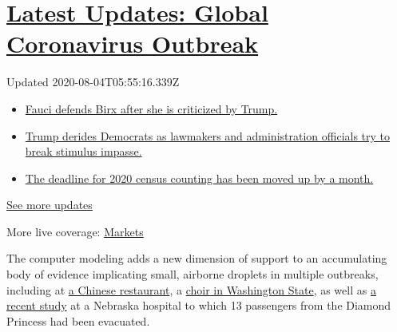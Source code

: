 \hypertarget{latest-updates-global-coronavirus-outbreak}{%
\section{\texorpdfstring{\href{https://www.nytimes.com/2020/08/03/world/coronavirus-covid-19.html?action=click\&pgtype=Article\&state=default\&region=MAIN_CONTENT_1\&context=storylines_live_updates}{Latest
Updates: Global Coronavirus
Outbreak}}{Latest Updates: Global Coronavirus Outbreak}}\label{latest-updates-global-coronavirus-outbreak}}

Updated 2020-08-04T05:55:16.339Z

\begin{itemize}
\tightlist
\item
  \href{https://www.nytimes.com/2020/08/03/world/coronavirus-covid-19.html?action=click\&pgtype=Article\&state=default\&region=MAIN_CONTENT_1\&context=storylines_live_updates\#link-4547638f}{Fauci
  defends Birx after she is criticized by Trump.}
\item
  \href{https://www.nytimes.com/2020/08/03/world/coronavirus-covid-19.html?action=click\&pgtype=Article\&state=default\&region=MAIN_CONTENT_1\&context=storylines_live_updates\#link-15e7f995}{Trump
  derides Democrats as lawmakers and administration officials try to
  break stimulus impasse.}
\item
  \href{https://www.nytimes.com/2020/08/03/world/coronavirus-covid-19.html?action=click\&pgtype=Article\&state=default\&region=MAIN_CONTENT_1\&context=storylines_live_updates\#link-e5a2cda}{The
  deadline for 2020 census counting has been moved up by a month.}
\end{itemize}

\href{https://www.nytimes.com/2020/08/03/world/coronavirus-covid-19.html?action=click\&pgtype=Article\&state=default\&region=MAIN_CONTENT_1\&context=storylines_live_updates}{See
more updates}

More live coverage:
\href{https://www.nytimes.com/live/2020/08/03/business/stock-market-today-coronavirus?action=click\&pgtype=Article\&state=default\&region=MAIN_CONTENT_1\&context=storylines_live_updates}{Markets}

The computer modeling adds a new dimension of support to an accumulating
body of evidence implicating small, airborne droplets in multiple
outbreaks, including at
\href{https://www.nytimes.com/2020/04/20/health/airflow-coronavirus-restaurants.html}{a
Chinese restaurant}, a
\href{https://www.medrxiv.org/content/10.1101/2020.06.15.20132027v2}{choir
in Washington State}, as well as
\href{https://www.nature.com/articles/s41598-020-69286-3}{a recent
study} at a Nebraska hospital to which 13 passengers from the Diamond
Princess had been evacuated.

